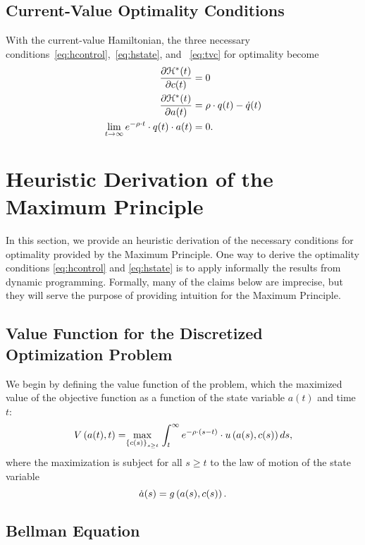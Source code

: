 \documentclass[letterpaper,12pt,leqno]{article}
\begin{document}
\subsection{Current-Value Optimality Conditions}

With the current-value Hamiltonian, the three necessary conditions~\eqref{eq:hcontrol},~\eqref{eq:hstate}, and ~\eqref{eq:tvc} for optimality become
\begin{align*}
\frac{\partial \mathcal{H}^{*}(t)}{\partial c(t)} &=0\\
\frac{\partial \mathcal{H}^{*}(t)}{\partial a(t)} &=\rho\cdot q(t)-\dot{q}(t)\\
\lim_{t\to \infty }e^{-\rho\cdot  t}\cdot q(t)\cdot a(t)&=0. 
\end{align*}

\section{Heuristic Derivation of the Maximum Principle}\label{sec:HEURISTIC}

In this section, we provide an heuristic derivation of the necessary conditions for optimality provided by the Maximum Principle. One way to derive the optimality conditions \eqref{eq:hcontrol} and \eqref{eq:hstate} is to apply informally the results from dynamic programming. Formally, many of the claims below are imprecise, but they will serve the purpose of providing intuition for the Maximum Principle.

\subsection{Value Function for the Discretized Optimization Problem}

We begin by defining the value function of the problem, which the maximized value of the objective function as a function of the
state variable $a(t)$ and time $t$:
\begin{equation*}
V\bp{a(t),t} =\underset{\bc{c(s)}_{s\geq t}}{\max} \int_{t}^{\infty }e^{-\r \cdot \bp{s-t}}\cdot u\bp{a(s),c(s)} ds,
\end{equation*}
where the maximization is subject for all $s\geq t$ to the law of motion of the state variable
\begin{equation}
\dot{a}(s)=g\left( a(s),c(s) \right).\label{eq:lmh}
\end{equation}

\subsection{Bellman Equation}
\end{document}

